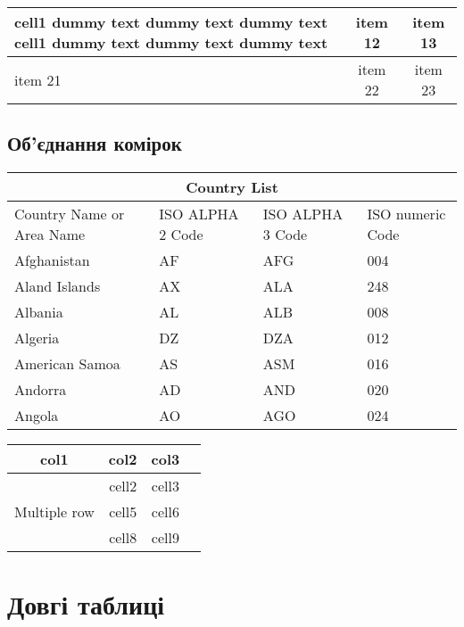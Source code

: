\begin{tabularx}{0.98\textwidth} { 
		| >{\raggedright\arraybackslash}X 
		| >{\centering\arraybackslash}c 
		| >{\raggedleft\arraybackslash}c | }
	\hline
	cell1 dummy text dummy text dummy text cell1 dummy text dummy text dummy text & item 12 & item 13 \\
	\hline
	item 21  & item 22  & item 23  \\
	\hline
\end{tabularx}

\subsection{Об'єднання комірок}

\begin{tabular}{ |p{3cm}||p{3cm}|p{3cm}|p{3cm}|  }
	\hline
	\multicolumn{4}{|c|}{Country List} \\
	\hline
	Country Name or Area Name& ISO ALPHA 2 Code &ISO ALPHA 3 Code&ISO numeric Code\\
	\hline
	Afghanistan   & AF    &AFG&   004\\
	Aland Islands &   AX  & ALA   &248\\
	Albania 	  &AL & ALB&  008\\
	Algeria       &DZ & DZA&  012\\
	American Samoa&   AS  & ASM&016\\
	Andorra& AD  & AND   &020\\
	Angola& AO  & AGO&024\\
	\hline
\end{tabular}


\begin{center}
	\begin{tabular}{ |c|c|c|c| } 
		\hline
		col1 & col2 & col3 \\
		\hline
		\multirow{3}{4em}{Multiple row} & cell2 & cell3 \\ 
		& cell5 & cell6 \\ 
		& cell8 & cell9 \\ 
		\hline
	\end{tabular}
\end{center}

\section{Довгі таблиці}

\lipsum[1]
\lipsum[1]


